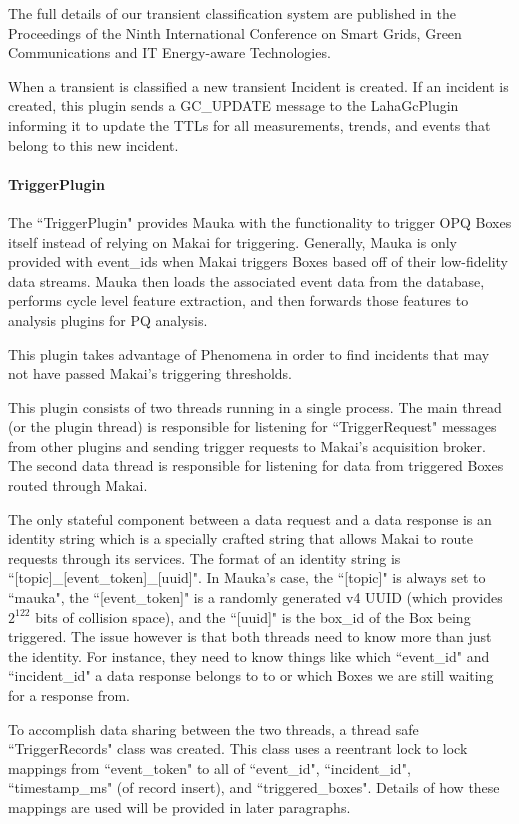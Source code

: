 The full details of our transient classification system are published in the Proceedings of the Ninth International Conference on Smart Grids, Green Communications and IT Energy-aware Technologies\cite{csdl2-19-02}.

When a transient is classified a new transient Incident is created. If an incident is created, this plugin sends a GC\_UPDATE message to the LahaGcPlugin informing it to update the TTLs for all measurements, trends, and events that belong to this new incident.

\paragraph{TriggerPlugin}\label{sec:trigger_plugin}
The ``TriggerPlugin" provides Mauka with the functionality to trigger OPQ Boxes itself instead of relying on Makai for triggering. Generally, Mauka is only provided with event\_ids when Makai triggers Boxes based off of their low-fidelity data streams. Mauka then loads the associated event data from the database, performs cycle level feature extraction, and then forwards those features to analysis plugins for PQ analysis.

This plugin takes advantage of Phenomena in order to find incidents that may not have passed Makai's triggering thresholds.

This plugin consists of two threads running in a single process. The main thread (or the plugin thread) is responsible for listening for ``TriggerRequest" messages from other plugins and sending trigger requests to Makai's acquisition broker. The second data thread is responsible for listening for data from triggered Boxes routed through Makai.

The only stateful component between a data request and a data response is an identity string which is a specially crafted string that allows Makai to route requests through its services. The format of an identity string is ``[topic]\_[event\_token]\_[uuid]". In Mauka's case, the ``[topic]" is always set to ``mauka", the ``[event\_token]" is a randomly generated v4 UUID (which provides $2^{122}$ bits of collision space), and the ``[uuid]" is the box\_id of the Box being triggered. The issue however is that both threads need to know more than just the identity. For instance, they need to know things like which ``event\_id" and ``incident\_id" a data response belongs to to or which Boxes we are still waiting for a response from.

To accomplish data sharing between the two threads, a thread safe ``TriggerRecords" class was created. This class uses a reentrant lock to lock mappings from ``event\_token" to all of ``event\_id", ``incident\_id", ``timestamp\_ms" (of record insert), and ``triggered\_boxes".  Details of how these mappings are used will be provided in later paragraphs.

